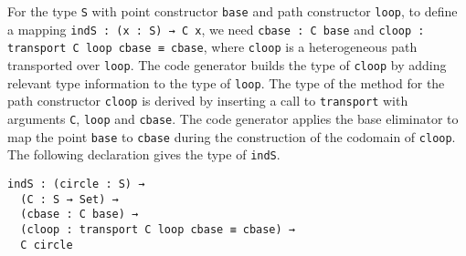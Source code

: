 \documentclass[runningheads]{llncs}
\begin{document}

For the type {\tt S} with point constructor {\tt base} and path constructor {\tt loop}, to define a mapping {\tt indS : (x : S) → C x}, we need {\tt cbase : C base} and {\tt cloop : transport C loop cbase ≡ cbase}, where {\tt cloop} is a heterogeneous path transported over {\tt loop}. The code generator builds the type of {\tt cloop} by adding relevant type information to the type of {\tt loop}.
The type of the method for the path constructor {\tt cloop} is derived by inserting a call to {\tt transport} with arguments {\tt C}, {\tt loop} and {\tt cbase}. %
The code generator applies the base eliminator to map the point {\tt base} to {\tt cbase} during the construction of the codomain of {\tt cloop}. The following declaration gives the type of {\tt indS}.
\begin{center}
\fontsize{7.9pt}{2pt}\selectfont
\begin{BVerbatim}
indS : (circle : S) → 
  (C : S → Set) →
  (cbase : C base) →
  (cloop : transport C loop cbase ≡ cbase) →
  C circle
\end{BVerbatim}
\end{center}
\end{document}
